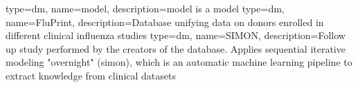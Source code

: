 {
    type=dm,
    name=model,
    description={model is a model}
}
{
    type=dm,
    name=FluPrint,
    description={Database unifying data on donors enrolled in different clinical influenza studies}
}
{
    type=dm,
    name=SIMON,
    description={Follow up study performed by the creators of the \flup database. Applies sequential iterative modeling "overnight" (simon), which is an automatic machine learning pipeline to extract knowledge from clinical datasets}
}
